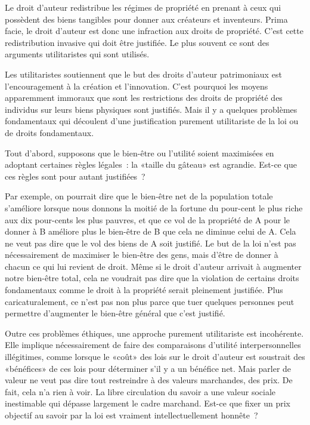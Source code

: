 Le droit d'auteur redistribue les régimes de propriété en prenant à ceux qui possèdent des biens tangibles pour donner aux créateurs et inventeurs. Prima facie, le droit d'auteur est donc une infraction aux droits de propriété. C'est cette redistribution invasive qui doit être justifiée. Le plus souvent ce sont des arguments utilitaristes qui sont utilisés. 

Les utilitaristes soutiennent que le but des droits d'auteur patrimoniaux est l'encouragement à la création et l'innovation. C'est pourquoi les moyens apparemment immoraux que sont les restrictions des droits de propriété des individus sur leurs biens physiques sont justifiés. Mais il y a quelques problèmes fondamentaux qui découlent d'une justification purement utilitariste de la loi ou de droits fondamentaux. 

Tout d'abord, supposons que le bien-être ou l'utilité soient maximisées en adoptant certaines règles légales~: la «taille du gâteau» est agrandie. Est-ce que ces règles sont pour autant justifiées~?

Par exemple, on pourrait dire que le bien-être net de la population totale s'améliore lorsque nous donnons la moitié de la fortune du pour-cent le plus riche aux dix pour-cents les plus pauvres, et que ce vol de la propriété de A pour le donner à B améliore plus le bien-être de B que cela ne diminue celui de A. Cela ne veut pas dire que le vol des biens de A soit justifié. Le but de la loi n'est pas nécessairement de maximiser le bien-être des gens, mais d'être de donner à chacun ce qui lui revient de droit. Même si le droit d'auteur arrivait à augmenter notre bien-être total, cela ne voudrait pas dire que la violation de certains droits fondamentaux comme le droit à la propriété serait pleinement justifiée. Plus caricaturalement, ce n'est pas non plus parce que tuer quelques personnes peut permettre d'augmenter le bien-être général que c'est justifié.

Outre ces problèmes éthiques, une approche purement utilitariste est incohérente. Elle implique nécessairement de faire des comparaisons d'utilité interpersonnelles illégitimes, comme lorsque le «coût» des lois sur le droit d'auteur est soustrait des «bénéfices» de ces lois pour déterminer s'il y a un bénéfice net. Mais parler de valeur ne veut pas dire tout restreindre à des valeurs marchandes, des prix. De fait, cela n'a rien à voir. La libre circulation du savoir a une valeur sociale inestimable qui dépasse largement le cadre marchand. Est-ce que fixer un prix objectif au savoir par la loi est vraiment intellectuellement honnête~?

